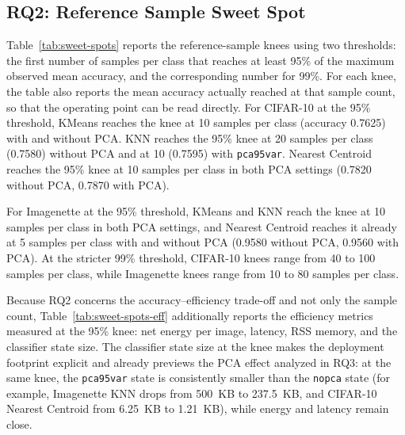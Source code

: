 \documentclass[sigconf,review]{acmart}
\begin{document}
\subsection{RQ2: Reference Sample Sweet Spot}
Table~\ref{tab:sweet-spots} reports the reference-sample knees using two thresholds: the first number of samples per class that reaches at least 95\% of the maximum observed mean accuracy, and the corresponding number for 99\%.
For each knee, the table also reports the mean accuracy actually reached at that sample count, so that the operating point can be read directly.
For CIFAR-10 at the 95\% threshold, KMeans reaches the knee at 10 samples per class (accuracy 0.7625) with and without PCA.
KNN reaches the 95\% knee at 20 samples per class (0.7580) without PCA and at 10 (0.7595) with \texttt{pca95var}.
Nearest Centroid reaches the 95\% knee at 10 samples per class in both PCA settings (0.7820 without PCA, 0.7870 with PCA).

For Imagenette at the 95\% threshold, KMeans and KNN reach the knee at 10 samples per class in both PCA settings, and Nearest Centroid reaches it already at 5 samples per class with and without PCA (0.9580 without PCA, 0.9560 with PCA).
At the stricter 99\% threshold, CIFAR-10 knees range from 40 to 100 samples per class, while Imagenette knees range from 10 to 80 samples per class.

Because RQ2 concerns the accuracy--efficiency trade-off and not only the sample count, Table~\ref{tab:sweet-spots-eff} additionally reports the efficiency metrics measured at the 95\% knee: net energy per image, latency, RSS memory, and the classifier state size.
The classifier state size at the knee makes the deployment footprint explicit and already previews the PCA effect analyzed in RQ3: at the same knee, the \texttt{pca95var} state is consistently smaller than the \texttt{nopca} state (for example, Imagenette KNN drops from 500~KB to 237.5~KB, and CIFAR-10 Nearest Centroid from 6.25~KB to 1.21~KB), while energy and latency remain close.
\end{document}
